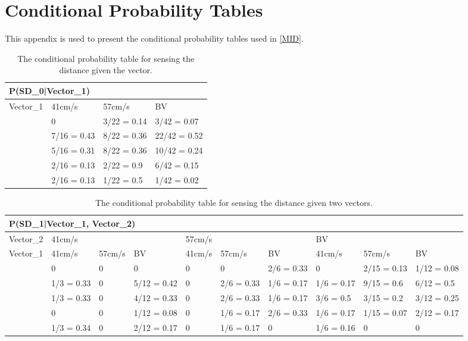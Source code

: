 \chapter{Conditional Probability Tables}\label{AppProbTabs}
This appendix is used to present the conditional probability tables used in \autoref{MID}.

\begin{table}[H]
\centering
\begin{tabular}{|l|l|l|l|}
\hline
\multicolumn{4}{|l|}{P(SD\_0|Vector\_1)} \\ \hline
Vector\_1     & 41cm/s & 57cm/s & BV \\\hline 
[0 - 60]      & 0       & 3/22 = 0.14 & 3/42 = 0.07\\ \hline 
[60 - 75]    & 7/16 = 0.43 & 8/22 = 0.36 & 22/42 = 0.52\\ \hline
[75 - 90]   & 5/16 = 0.31 & 8/22 = 0.36 & 10/42 = 0.24\\ \hline
[90 - 105]   & 2/16 = 0.13 & 2/22 = 0.9 & 6/42 = 0.15\\ \hline
[105 - 255]   & 2/16 = 0.13& 1/22 = 0.5 & 1/42 = 0.02 \\ \hline
\end{tabular}
\caption{The conditional probability table for sensing the distance given the
vector.}
\label{SDtable}
\end{table}

\begin{table}[H]
\centering
\begin{tabular}{|l|p{1.2cm}|p{1.2cm}|p{1.2cm}|p{1.2cm}|p{1.2cm}|p{1.2cm}|p{1.2cm}|p{1.2cm}|p{1.2cm}|}
\hline
\multicolumn{10}{|l|}{P(SD\_1|Vector\_1, Vector\_2)} \\\hline
Vector\_2 & \multicolumn{3}{l|}{41cm/s} & \multicolumn{3}{l|}{57cm/s} &
\multicolumn{3}{l|}{BV}\\\hline
Vector\_1 & 41cm/s      &  57cm/s     & BV     & 41cm/s      & 57cm/s     
& BV & 41cm/s & 57cm/s & BV \\\hline
[0-60]& 0 & 0 & 0 & 0 & 0 & 2/6 = 0.33& 0 & 2/15 = 0.13 & 1/12 = 0.08 \\\hline
[60-75]& 1/3 = 0.33 & 0 & 5/12 = 0.42 & 0 & 2/6 = 0.33 & 1/6 = 0.17 & 1/6 = 0.17
& 9/15 = 0.6 & 6/12 = 0.5\\ \hline
[75-90] & 1/3 = 0.33 & 0 & 4/12 = 0.33 & 0 & 2/6 = 0.33 & 1/6 = 0.17 & 3/6 =
0.5 & 3/15 = 0.2 &3/12 = 0.25\\\hline
[90-105] & 0 & 0 & 1/12 = 0.08 & 0 & 1/6 = 0.17 & 2/6 = 0.33 & 1/6 = 0.17
& 1/15 = 0.07 & 2/12 = 0.17\\\hline
[105-255] & 1/3 = 0.34 & 0 & 2/12 = 0.17& 0 & 1/6 = 0.17 & 0 & 1/6 = 0.16 & 0
&0\\\hline
\end{tabular}
\caption{The conditional probability table for sensing the distance given two
vectors.}
\label{SDtable2}
\end{table}

